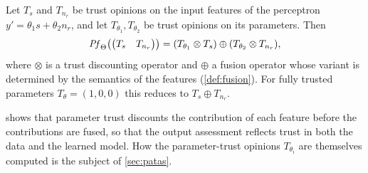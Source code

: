 \begin{lemma}\label{lem:perceptron}
Let \(T_s\) and \(T_{n_r}\) be trust opinions on the input features of the perceptron \(y\prime = \theta_1 s + \theta_2 n_r\), and let \(T_{\theta_1}, T_{\theta_2}\) be trust opinions on its parameters. Then
\begin{equation}
\label{eq:sol}
    \mathit{Pf}_\Theta\!\left(\begin{pmatrix} T_s & T_{n_r}\end{pmatrix}\right) =  (T_{\theta_1}\otimes T_s)\oplus (T_{\theta_2}\otimes T_{n_r}),
\end{equation}
where \(\otimes\) is a trust discounting operator and \(\oplus\) a fusion operator whose variant is determined by the semantics of the features (\cref{def:fusion}). For fully trusted parameters \(T_\theta = (1,0,0)\) this reduces to \(T_s \oplus T_{n_r}\).
\end{lemma}

 shows that parameter trust discounts the contribution of each feature before the contributions are fused, so that the output assessment reflects trust in both the data and the learned model. How the parameter-trust opinions \(T_{\theta_i}\) are themselves computed is the subject of \cref{sec:patas}.
